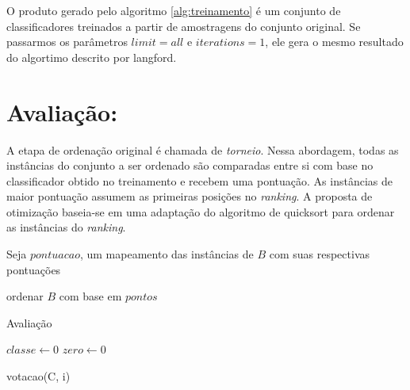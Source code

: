 O produto gerado pelo algoritmo \ref{alg:treinamento} é um conjunto de classificadores treinados a partir de amostragens do conjunto original. Se passarmos os parâmetros $limit=all$ e $iterations=1$, ele gera o mesmo resultado do algortimo descrito por {{langford}}.

\section{Avaliação: }
A etapa de ordenação original é chamada de \emph{torneio}. Nessa abordagem, todas as instâncias do conjunto a ser ordenado são comparadas entre si com base no classificador obtido no treinamento e recebem uma pontuação. As instâncias de maior pontuação assumem as primeiras posições no \emph{ranking}. A proposta de otimização baseia-se em uma adaptação do algoritmo de quicksort para ordenar as instâncias do \emph{ranking}.

\begin{algorithm}

    Seja $pontuacao$, um mapeamento das instâncias de $B$ com suas respectivas pontuações


    ordenar $B$ com base em $pontos$

    \caption{Avaliação}
    \label{alg:avaliacao}
\end{algorithm}

\begin{function}
    $classe \gets 0$\;
    $zero \gets 0$




    \caption{votacao(C, i)}
    \label{func:votacao}
\end{function}